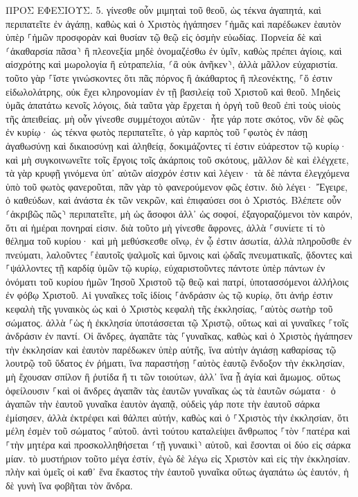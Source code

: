 \documentclass[twoside, 9pt]{extreport}
\begin{document}
ΠΡΟΣ ΕΦΕΣΙΟΥΣ.
5.
γίνεσθε οὖν μιμηταὶ τοῦ θεοῦ, ὡς τέκνα ἀγαπητά, 
καὶ περιπατεῖτε ἐν ἀγάπῃ, καθὼς καὶ ὁ Χριστὸς ἠγάπησεν ⸀ἡμᾶς καὶ παρέδωκεν ἑαυτὸν ὑπὲρ ⸀ἡμῶν προσφορὰν καὶ θυσίαν τῷ θεῷ εἰς ὀσμὴν εὐωδίας. 
Πορνεία δὲ καὶ ⸂ἀκαθαρσία πᾶσα⸃ ἢ πλεονεξία μηδὲ ὀνομαζέσθω ἐν ὑμῖν, καθὼς πρέπει ἁγίοις, 
καὶ αἰσχρότης καὶ μωρολογία ἢ εὐτραπελία, ⸂ἃ οὐκ ἀνῆκεν⸃, ἀλλὰ μᾶλλον εὐχαριστία. 
τοῦτο γὰρ ⸀ἴστε γινώσκοντες ὅτι πᾶς πόρνος ἢ ἀκάθαρτος ἢ πλεονέκτης, ⸀ὅ ἐστιν εἰδωλολάτρης, οὐκ ἔχει κληρονομίαν ἐν τῇ βασιλείᾳ τοῦ Χριστοῦ καὶ θεοῦ. 
Μηδεὶς ὑμᾶς ἀπατάτω κενοῖς λόγοις, διὰ ταῦτα γὰρ ἔρχεται ἡ ὀργὴ τοῦ θεοῦ ἐπὶ τοὺς υἱοὺς τῆς ἀπειθείας. 
μὴ οὖν γίνεσθε συμμέτοχοι αὐτῶν· 
ἦτε γάρ ποτε σκότος, νῦν δὲ φῶς ἐν κυρίῳ· ὡς τέκνα φωτὸς περιπατεῖτε, 
ὁ γὰρ καρπὸς τοῦ ⸀φωτὸς ἐν πάσῃ ἀγαθωσύνῃ καὶ δικαιοσύνῃ καὶ ἀληθείᾳ, 
δοκιμάζοντες τί ἐστιν εὐάρεστον τῷ κυρίῳ· 
καὶ μὴ συγκοινωνεῖτε τοῖς ἔργοις τοῖς ἀκάρποις τοῦ σκότους, μᾶλλον δὲ καὶ ἐλέγχετε, 
τὰ γὰρ κρυφῇ γινόμενα ὑπ᾽ αὐτῶν αἰσχρόν ἐστιν καὶ λέγειν· 
τὰ δὲ πάντα ἐλεγχόμενα ὑπὸ τοῦ φωτὸς φανεροῦται, 
πᾶν γὰρ τὸ φανερούμενον φῶς ἐστιν. διὸ λέγει· Ἔγειρε, ὁ καθεύδων, καὶ ἀνάστα ἐκ τῶν νεκρῶν, καὶ ἐπιφαύσει σοι ὁ Χριστός. 
Βλέπετε οὖν ⸂ἀκριβῶς πῶς⸃ περιπατεῖτε, μὴ ὡς ἄσοφοι ἀλλ᾽ ὡς σοφοί, 
ἐξαγοραζόμενοι τὸν καιρόν, ὅτι αἱ ἡμέραι πονηραί εἰσιν. 
διὰ τοῦτο μὴ γίνεσθε ἄφρονες, ἀλλὰ ⸀συνίετε τί τὸ θέλημα τοῦ κυρίου· 
καὶ μὴ μεθύσκεσθε οἴνῳ, ἐν ᾧ ἐστιν ἀσωτία, ἀλλὰ πληροῦσθε ἐν πνεύματι, 
λαλοῦντες ⸀ἑαυτοῖς ψαλμοῖς καὶ ὕμνοις καὶ ᾠδαῖς πνευματικαῖς, ᾄδοντες καὶ ⸀ψάλλοντες τῇ καρδίᾳ ὑμῶν τῷ κυρίῳ, 
εὐχαριστοῦντες πάντοτε ὑπὲρ πάντων ἐν ὀνόματι τοῦ κυρίου ἡμῶν Ἰησοῦ Χριστοῦ τῷ θεῷ καὶ πατρί, 
ὑποτασσόμενοι ἀλλήλοις ἐν φόβῳ Χριστοῦ. 
Αἱ γυναῖκες τοῖς ἰδίοις ⸀ἀνδράσιν ὡς τῷ κυρίῳ, 
ὅτι ἀνήρ ἐστιν κεφαλὴ τῆς γυναικὸς ὡς καὶ ὁ Χριστὸς κεφαλὴ τῆς ἐκκλησίας, ⸀αὐτὸς σωτὴρ τοῦ σώματος. 
ἀλλὰ ⸀ὡς ἡ ἐκκλησία ὑποτάσσεται τῷ Χριστῷ, οὕτως καὶ αἱ γυναῖκες ⸀τοῖς ἀνδράσιν ἐν παντί. 
Οἱ ἄνδρες, ἀγαπᾶτε τὰς ⸀γυναῖκας, καθὼς καὶ ὁ Χριστὸς ἠγάπησεν τὴν ἐκκλησίαν καὶ ἑαυτὸν παρέδωκεν ὑπὲρ αὐτῆς, 
ἵνα αὐτὴν ἁγιάσῃ καθαρίσας τῷ λουτρῷ τοῦ ὕδατος ἐν ῥήματι, 
ἵνα παραστήσῃ ⸀αὐτὸς ἑαυτῷ ἔνδοξον τὴν ἐκκλησίαν, μὴ ἔχουσαν σπίλον ἢ ῥυτίδα ἤ τι τῶν τοιούτων, ἀλλ᾽ ἵνα ᾖ ἁγία καὶ ἄμωμος. 
οὕτως ὀφείλουσιν ⸀καὶ οἱ ἄνδρες ἀγαπᾶν τὰς ἑαυτῶν γυναῖκας ὡς τὰ ἑαυτῶν σώματα· ὁ ἀγαπῶν τὴν ἑαυτοῦ γυναῖκα ἑαυτὸν ἀγαπᾷ, 
οὐδεὶς γάρ ποτε τὴν ἑαυτοῦ σάρκα ἐμίσησεν, ἀλλὰ ἐκτρέφει καὶ θάλπει αὐτήν, καθὼς καὶ ὁ ⸀Χριστὸς τὴν ἐκκλησίαν, 
ὅτι μέλη ἐσμὲν τοῦ σώματος ⸀αὐτοῦ. 
ἀντὶ τούτου καταλείψει ἄνθρωπος ⸀τὸν ⸀πατέρα καὶ ⸀τὴν μητέρα καὶ προσκολληθήσεται ⸂τῇ γυναικὶ⸃ αὐτοῦ, καὶ ἔσονται οἱ δύο εἰς σάρκα μίαν. 
τὸ μυστήριον τοῦτο μέγα ἐστίν, ἐγὼ δὲ λέγω εἰς Χριστὸν καὶ εἰς τὴν ἐκκλησίαν. 
πλὴν καὶ ὑμεῖς οἱ καθ᾽ ἕνα ἕκαστος τὴν ἑαυτοῦ γυναῖκα οὕτως ἀγαπάτω ὡς ἑαυτόν, ἡ δὲ γυνὴ ἵνα φοβῆται τὸν ἄνδρα. 
\end{document}
